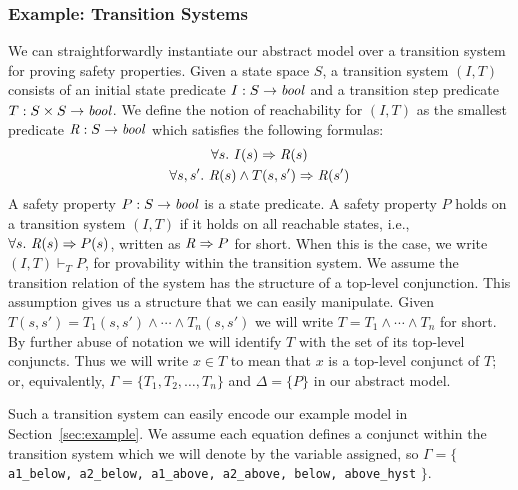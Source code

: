 \subsubsection{Example: Transition Systems}
\label{sec:ts}
We can straightforwardly instantiate our abstract model over a transition system for proving safety properties.  Given a state space $S$, a transition system $(I,T)$ consists of an initial state predicate $I : S \to \mathit{bool}$ and a transition step predicate $T : S \times S \to \mathit{bool}$. We define the notion of reachability for $(I, T)$ as the smallest predicate $\mathit{R} : S \to \mathit{bool}$ which satisfies the following formulas:
\begin{gather*}
  \forall s.~ I(s) \Rightarrow \mathit{R}(s) \\
  \forall s, s'.~ \mathit{R}(s) \land T(s, s') \Rightarrow \mathit{R}(s')
\end{gather*}
A safety property $P : S \to \mathit{bool}$ is a state predicate. A safety property $P$ holds on a transition system $(I, T)$ if it holds on all reachable states, i.e., $\forall s.~ \mathit{R}(s) \Rightarrow P(s)$, written as $\mathit{R} \Rightarrow P$ for short. When this is the case, we write $(I, T)\vdash_{T} P$, for provability within the transition system.  We assume the transition relation of the system has the structure of a top-level conjunction. This assumption gives us a structure that we can easily manipulate. Given $T(s, s') = T_1(s, s') \land \cdots \land T_n(s, s')$ we will write $T = T_1 \land \cdots \land T_n$ for short. By further abuse of notation we will identify $T$ with the set of its top-level conjuncts. Thus we will write $x \in T$ to mean that $x$ is a top-level conjunct of $T$; or, equivalently, $\Gamma = \{T_1, T_2, \ldots, T_n\}$ and $\Delta = \{P\}$ in our abstract model.

Such a transition system can easily encode our example model in Section~\ref{sec:example}.  We assume each equation defines a conjunct within the transition system which we will denote by the variable assigned, so $\Gamma = \{$ {\small \texttt{a1\_below, a2\_below, a1\_above, a2\_above, below, above\_hyst}} $\}$.





